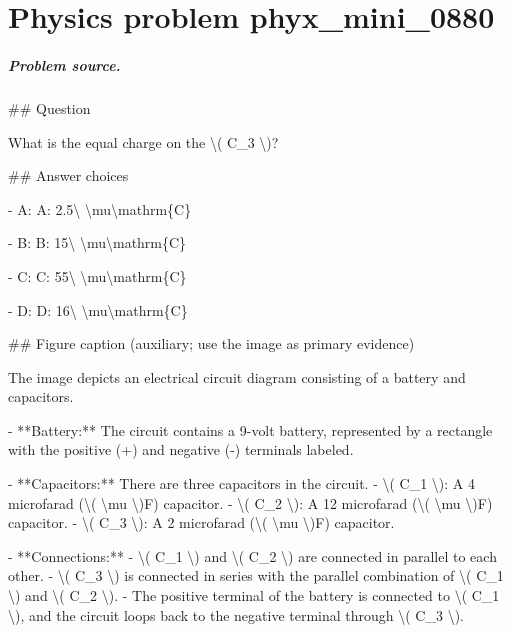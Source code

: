 
\chapter{Physics problem phyx\_mini\_0880}
\label{ch:PhyXMiniProblems_problem_phyx_mini_0880}

\paragraph{Problem source.}
\#\# Question

What is the equal charge on the \textbackslash{}( C\_3 \textbackslash{})?

\#\# Answer choices

- A: A: 2.5\textbackslash{} \textbackslash{}mu\textbackslash{}mathrm\{C\}

- B: B: 15\textbackslash{} \textbackslash{}mu\textbackslash{}mathrm\{C\}

- C: C: 55\textbackslash{} \textbackslash{}mu\textbackslash{}mathrm\{C\}

- D: D: 16\textbackslash{} \textbackslash{}mu\textbackslash{}mathrm\{C\}

\#\# Figure caption (auxiliary; use the image as primary evidence)

The image depicts an electrical circuit diagram consisting of a battery and capacitors. 

- **Battery:** The circuit contains a 9-volt battery, represented by a rectangle with the positive (+) and negative (-) terminals labeled.
  
- **Capacitors:** There are three capacitors in the circuit.
  - \textbackslash{}( C\_1 \textbackslash{}): A 4 microfarad (\textbackslash{}( \textbackslash{}mu \textbackslash{})F) capacitor.
  - \textbackslash{}( C\_2 \textbackslash{}): A 12 microfarad (\textbackslash{}( \textbackslash{}mu \textbackslash{})F) capacitor.
  - \textbackslash{}( C\_3 \textbackslash{}): A 2 microfarad (\textbackslash{}( \textbackslash{}mu \textbackslash{})F) capacitor.

- **Connections:**
  - \textbackslash{}( C\_1 \textbackslash{}) and \textbackslash{}( C\_2 \textbackslash{}) are connected in parallel to each other.
  - \textbackslash{}( C\_3 \textbackslash{}) is connected in series with the parallel combination of \textbackslash{}( C\_1 \textbackslash{}) and \textbackslash{}( C\_2 \textbackslash{}).
  - The positive terminal of the battery is connected to \textbackslash{}( C\_1 \textbackslash{}), and the circuit loops back to the negative terminal through \textbackslash{}( C\_3 \textbackslash{}).

